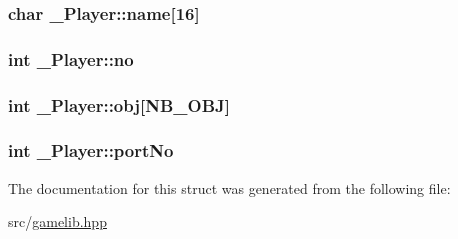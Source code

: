 \subsubsection[{\texorpdfstring{name}{name}}]{\setlength{\rightskip}{0pt plus 5cm}char \+\_\+\+Player\+::name\mbox{[}16\mbox{]}}\hypertarget{struct___player_a9a87b96be77fbbac4a6fcd0606994a9c}{}\label{struct___player_a9a87b96be77fbbac4a6fcd0606994a9c}
\subsubsection[{\texorpdfstring{no}{no}}]{\setlength{\rightskip}{0pt plus 5cm}int \+\_\+\+Player\+::no}\hypertarget{struct___player_a962d40b7ae74f37b92caffdd783a12ee}{}\label{struct___player_a962d40b7ae74f37b92caffdd783a12ee}
\subsubsection[{\texorpdfstring{obj}{obj}}]{\setlength{\rightskip}{0pt plus 5cm}int \+\_\+\+Player\+::obj\mbox{[}{\bf N\+B\+\_\+\+O\+BJ}\mbox{]}}\hypertarget{struct___player_abb9d194d90baed848f51eebfca8903c9}{}\label{struct___player_abb9d194d90baed848f51eebfca8903c9}
\subsubsection[{\texorpdfstring{port\+No}{portNo}}]{\setlength{\rightskip}{0pt plus 5cm}int \+\_\+\+Player\+::port\+No}\hypertarget{struct___player_aca73f3888d3a1f70320603b8af81ac62}{}\label{struct___player_aca73f3888d3a1f70320603b8af81ac62}


The documentation for this struct was generated from the following file\+:\begin{DoxyCompactItemize}
\item 
src/\hyperlink{gamelib_8hpp}{gamelib.\+hpp}\end{DoxyCompactItemize}
